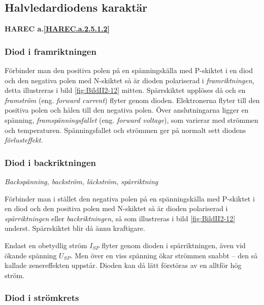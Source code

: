\subsection{Halvledardiodens karaktär}
\textbf{HAREC a.\ref{HAREC.a.2.5.1.2}\label{myHAREC.a.2.5.1.2}}

\subsubsection{Diod i framriktningen}

Förbinder man den positiva polen på en spänningskälla med P-skiktet i en diod
och den negativa polen med N-skiktet så är dioden polariserad i
\emph{framriktningen}, detta illustreras i bild \ref{fig:BildII2-12} mitten.
Spärrskiktet upplöses då och en \emph{framström}
(eng. \emph{forward current}) flyter genom dioden.
Elektronerna flyter till den positiva polen och hålen till den negativa polen.
Över anslutningarna ligger en spänning, \emph{framspänningsfallet}
(eng. \emph{forward voltage}), som varierar med strömmen och temperaturen.
Spänningsfallet och strömmen ger på normalt sett diodens \emph{förlusteffekt}.

\subsubsection{Diod i backriktningen}

\emph{Backspänning, backström, läckström, spärriktning}

Förbinder man i stället den negativa polen på en spänningskälla med P-skiktet i
en diod och den positiva polen med N-skiktet så är dioden polariserad i
\emph{spärriktningen} eller \emph{backriktningen}, så som illustreras i
bild \ref{fig:BildII2-12} underst.
Spärrskiktet blir då ännu kraftigare.

Endast en obetydlig ström \(I_{SP}\) flyter genom dioden i spärriktningen, även vid 
ökande spänning \(U_{SP}\).
Men över en viss spänning ökar strömmen snabbt -- den så kallade zenereffekten
uppstår.
Dioden kan då lätt förstöras av en alltför hög ström.

\subsubsection{Diod i strömkrets}

